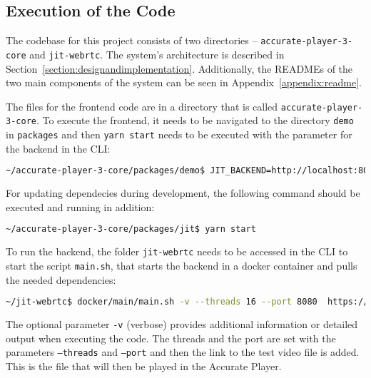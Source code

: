 \documentclass[../MasterThesis.tex]{subfiles}
\begin{document}
	
	
	
	
	
	








\subsection{Execution of the Code} \label{subsection:runninghtecode}

The codebase for this project consists of two directories -- \texttt{accurate-player-3-core} and \texttt{jit-webrtc}. The system's architecture is described in Section~\ref{section:designandimplementation}. Additionally, the READMEs of the two main components of the system can be seen in Appendix~\ref{appendix:readme}.


The files for the frontend code are in a directory that is called \texttt{accurate-player-3-core}. To execute the frontend, it needs to be navigated to the directory \texttt{demo} in \texttt{packages} and then \texttt{yarn start} needs to be executed with the parameter for the backend in the CLI:
\begin{lstlisting}[language=bash, numbers=none, columns=fullflexible]
	~/accurate-player-3-core/packages/demo$ JIT_BACKEND=http://localhost:8080 yarn start
\end{lstlisting}

For updating dependecies during development, the following command should be executed and running in addition: 
\begin{lstlisting}[language=bash, numbers=none, columns=fullflexible]
	~/accurate-player-3-core/packages/jit$ yarn start
\end{lstlisting}



To run the backend, the folder \texttt{jit-webrtc} needs to be accessed in the CLI to start the script \texttt{main.sh}, that starts the backend in a docker container and pulls the needed dependencies:
\begin{lstlisting}[language=bash, numbers=none, columns=fullflexible]
	~/jit-webrtc$ docker/main/main.sh -v --threads 16 --port 8080  https://s3.eu-central-1.amazonaws.com/accurate-player-demo-assets/timecode/sintel-2048-timecode-stereo.mp4
\end{lstlisting}

The optional parameter \texttt{-v} (verbose) provides additional information or detailed output when executing the code. The threads and the port are set with the parameters \texttt{--threads} and \texttt{--port} and then the link to the test video file is added. This is the file that will then be played in the Accurate Player.






	
	
	

	
	
\end{document}
